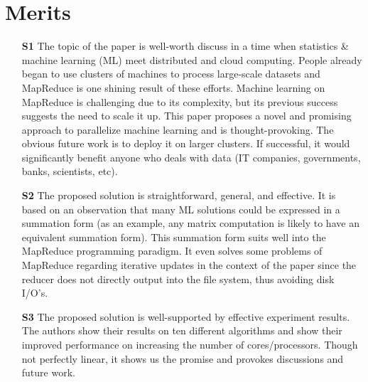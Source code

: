 \documentclass[a4paper]{article}
\begin{document}
\section*{Merits}
\begin{itemize}
\item[\textbf{S1}]
The topic of the paper is well-worth discuss in a time when statistics \& machine learning (ML)
meet distributed and cloud computing. People already began to use clusters of machines to process
large-scale datasets and MapReduce is one shining result of these efforts. Machine learning on
MapReduce is challenging due to its complexity, but its previous success suggests the need to scale
it up. This paper proposes a novel and promising approach to parallelize machine learning and is
thought-provoking. The obvious future work is to deploy it on larger clusters. If successful, it would
significantly benefit anyone who deals with data (IT companies, governments, banks, scientists, etc).

\item[\textbf{S2}]
The proposed solution is straightforward, general, and effective. It is based on an observation that
many ML solutions could be expressed in a summation form (as an example, any matrix computation 
is likely to have an equivalent summation form). This summation form suits well into the MapReduce
programming paradigm. It even solves some problems of MapReduce regarding iterative updates in
the context of the paper since the reducer does not directly output into the file system, thus avoiding
disk I/O's.

\item[\textbf{S3}]
The proposed solution is well-supported by effective experiment results. The authors show their
results on ten different algorithms and show their improved performance on increasing the number
of cores/processors. Though not perfectly linear, it shows us the promise and provokes discussions
and future work.
\end{itemize}
\end{document}
